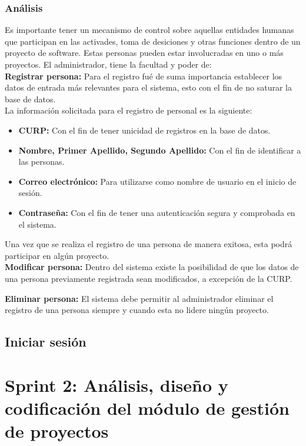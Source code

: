 \subsubsection {Análisis}
Es importante tener un mecanismo de control sobre aquellas entidades humanas que participan en las activades, toma de desiciones y otras funciones dentro de un proyecto de software. Estas personas pueden estar involucradas en uno o más proyectos.
\bigskip
El administrador, tiene la facultad y poder de:\\

\textbf {Registrar persona:} Para el registro fué de suma importancia establecer los datos de entrada más relevantes para el sistema, esto con el fin de no saturar la base de datos.\\

La información solicitada para el registro de personal es la siguiente:

\begin{itemize}
	\item \textbf{CURP:} Con el fin de tener unicidad de registros en la base de datos.
	\item \textbf{Nombre, Primer Apellido, Segundo Apellido:} Con el fin de identificar a las personas.
	\item \textbf{Correo electrónico:} Para utilizarse como nombre de usuario en el inicio de sesión.
	\item \textbf{Contraseña:} Con el fin de tener una autenticación segura y comprobada en el sistema.
\end{itemize}

Una vez que se realiza el registro de una persona de manera exitosa, esta podrá participar en algún proyecto.\\


\textbf {Modificar persona:} Dentro del sistema existe la posibilidad de que los datos de una persona previamente registrada sean modificados, a excepción de la CURP.

\textbf {Eliminar persona:} El sistema debe permitir al administrador eliminar el registro de una persona siempre y cuando esta no lidere ningún proyecto.

\subsection{Iniciar sesión}

\section{Sprint 2: Análisis, diseño y codificación del módulo de gestión de proyectos}
